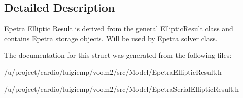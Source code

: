 \subsection{Detailed Description}
Epetra Elliptic Result is derived from the general \hyperlink{structvoom_1_1_elliptic_result}{EllipticResult} class and contains Epetra storage objects. Will be used by Epetra solver class. 

The documentation for this struct was generated from the following files:\begin{DoxyCompactItemize}
\item 
/u/project/cardio/luigiemp/voom2/src/Model/EpetraEllipticResult.h\item 
/u/project/cardio/luigiemp/voom2/src/Model/EpetraSerialEllipticResult.h\end{DoxyCompactItemize}
